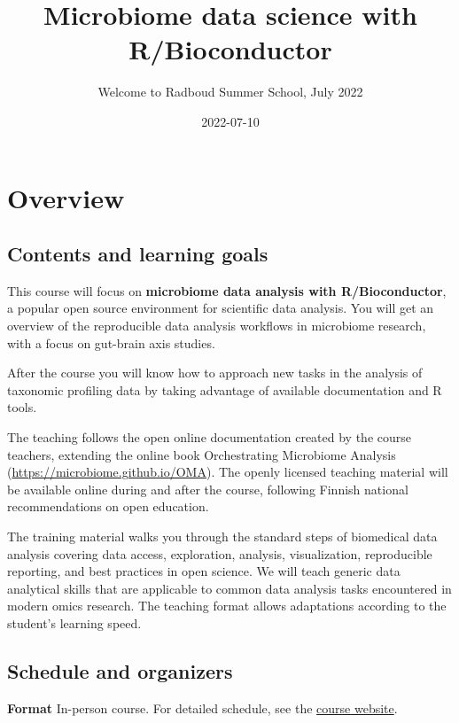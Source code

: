 \documentclass[
  oneside]{book}
\title{Microbiome data science with R/Bioconductor}
\subtitle{Welcome to Radboud Summer School, July 2022}
\author{}
\date{\vspace{-2.5em}2022-07-10}
\begin{document}
\maketitle

{
\setcounter{tocdepth}{1}
\tableofcontents
}
\hypertarget{overview}{%
\chapter{Overview}\label{overview}}

\hypertarget{contents-and-learning-goals}{%
\section{Contents and learning goals}\label{contents-and-learning-goals}}

This course will focus on \textbf{microbiome data analysis
with R/Bioconductor}, a popular open source environment for
scientific data analysis. You will get an overview of the
reproducible data analysis workflows in microbiome research, with a
focus on gut-brain axis studies.

After the course you will know how to approach new tasks in the
analysis of taxonomic profiling data by taking advantage of available
documentation and R tools.

The teaching follows the open online documentation created by the
course teachers, extending the online book Orchestrating Microbiome
Analysis (\url{https://microbiome.github.io/OMA}). The openly licensed
teaching material will be available online during and after the
course, following Finnish national recommendations on open education.

The training material walks you through the standard steps of
biomedical data analysis covering data access, exploration, analysis,
visualization, reproducible reporting, and best practices in open
science. We will teach generic data analytical skills that are
applicable to common data analysis tasks encountered in modern omics
research. The teaching format allows adaptations according to the
student's learning speed.

\hypertarget{schedule-and-organizers}{%
\section{Schedule and organizers}\label{schedule-and-organizers}}

\textbf{Format} In-person course. For detailed schedule, see the
\href{https://www.ru.nl/radboudsummerschool/courses/2022/registration-longer-possible-brain-bacteria}{course
website}.
\end{document}
